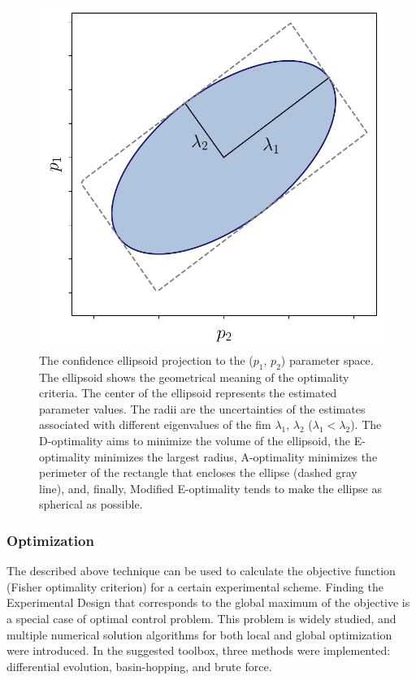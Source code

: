 \documentclass[10pt,A4paper]{article}
\begin{document}
\begin{figure}[H]
    \centering
    \includegraphics[scale=0.6]{Figures/optimality_criteria.pdf}
    \caption{{\footnotesize The confidence ellipsoid projection to the ($p_1$, $p_2$) parameter space. 
    The ellipsoid shows the geometrical meaning of the optimality criteria. 
    The center of the ellipsoid represents the estimated parameter values.
    The radii are the uncertainties of the estimates associated with different eigenvalues of the \ac{fim} $\lambda_1$, $\lambda_2$ ($\lambda_1 < \lambda_2$).
    The D-optimality aims to minimize the volume of the ellipsoid, the E-optimality minimizes the largest radius, A-optimality minimizes the perimeter of the rectangle that encloses the ellipse (dashed gray line), and, finally,  Modified E-optimality tends to make the ellipse as spherical as possible.}}
    \label{fig:opt_criteria}
\end{figure}
%
\subsubsection*{Optimization}
The described above technique can be used to calculate the objective function (Fisher optimality criterion) for a certain experimental scheme.
Finding the Experimental Design that corresponds to the global maximum of the objective is a special case of optimal control problem.
This problem is widely studied, and multiple numerical solution algorithms for both local and global optimization were introduced.
In the suggested toolbox, three methods were implemented: differential evolution, basin-hopping, and brute force.
\end{document}
